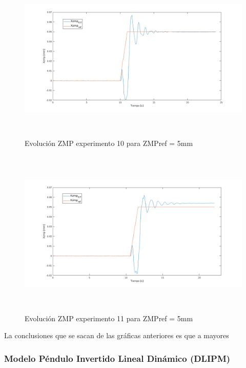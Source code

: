 \begin{figure}[H]
\centering
\includegraphics[width=13cm, height=8cm]{imagenes/apartado_5/5.1/58}
\caption{Evolución ZMP experimento 10 para ZMPref = 5mm}
\label{figura58}
\end{figure}

\begin{figure}[H]
\centering
\includegraphics[width=13cm, height=8cm]{imagenes/apartado_5/5.1/59}
\caption{Evolución ZMP experimento 11 para ZMPref = 5mm}
\label{figura59}
\end{figure}


La conclusiones que se sacan de las gráficas anteriores es que a mayores 

\subsubsection{Modelo Péndulo Invertido Lineal Dinámico (DLIPM)}\label{DLIPM}

